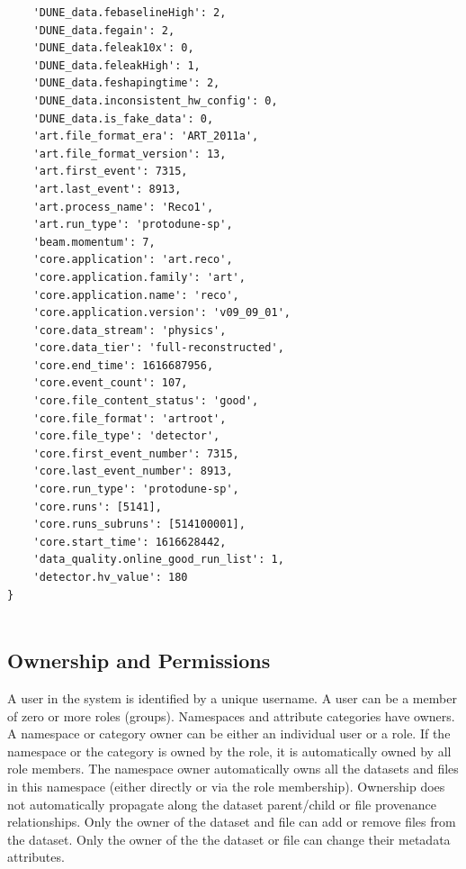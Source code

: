\documentclass[../main-v1.tex]{subfiles}
\begin{document}
\begin{verbatim}
    'DUNE_data.febaselineHigh': 2,
    'DUNE_data.fegain': 2,
    'DUNE_data.feleak10x': 0,
    'DUNE_data.feleakHigh': 1,
    'DUNE_data.feshapingtime': 2,
    'DUNE_data.inconsistent_hw_config': 0,
    'DUNE_data.is_fake_data': 0,
    'art.file_format_era': 'ART_2011a',
    'art.file_format_version': 13,
    'art.first_event': 7315,
    'art.last_event': 8913,
    'art.process_name': 'Reco1',
    'art.run_type': 'protodune-sp',
    'beam.momentum': 7,
    'core.application': 'art.reco',
    'core.application.family': 'art',
    'core.application.name': 'reco',
    'core.application.version': 'v09_09_01',
    'core.data_stream': 'physics',
    'core.data_tier': 'full-reconstructed',
    'core.end_time': 1616687956,
    'core.event_count': 107,
    'core.file_content_status': 'good',
    'core.file_format': 'artroot',
    'core.file_type': 'detector',
    'core.first_event_number': 7315,
    'core.last_event_number': 8913,
    'core.run_type': 'protodune-sp',
    'core.runs': [5141],
    'core.runs_subruns': [514100001],
    'core.start_time': 1616628442,
    'data_quality.online_good_run_list': 1,
    'detector.hv_value': 180
}


 \end{verbatim}

\subsection{Ownership and Permissions }

A  user in the system is identified  by a unique username. A user can be a member of zero or more roles (groups). Namespaces and attribute categories have owners. A namespace or category owner can be either an individual user or a role. If the namespace or the category is owned by the role, %
it is automatically owned by all role members. 
The namespace owner automatically owns all the datasets and files in this namespace (either directly or via the role membership). Ownership does not automatically propagate along the dataset parent/child or file provenance relationships. 
Only the owner of the dataset and file %
can add or remove files from the dataset. Only the owner of the the dataset or file can change their metadata attributes. 
\end{document}
